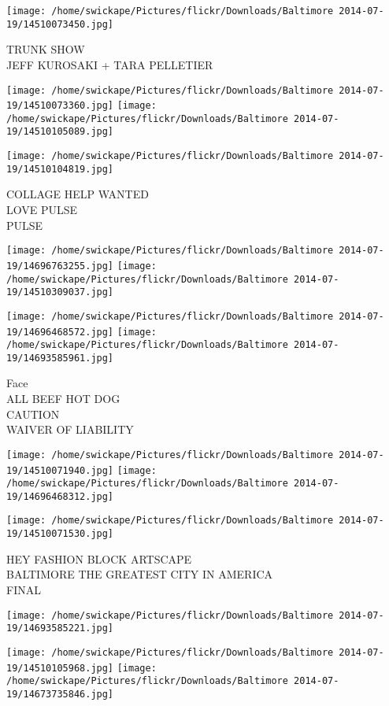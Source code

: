 \documentclass[10pt,letterpaper]{article}
\begin{document}
\vspace{0.25in}
\texttt{[image: /home/swickape/Pictures/flickr/Downloads/Baltimore 2014-07-19/14510073450.jpg]}

TRUNK SHOW\\
JEFF KUROSAKI + TARA PELLETIER
\pagebreak

\texttt{[image: /home/swickape/Pictures/flickr/Downloads/Baltimore 2014-07-19/14510073360.jpg]}
\texttt{[image: /home/swickape/Pictures/flickr/Downloads/Baltimore 2014-07-19/14510105089.jpg]}

\vspace{0.25in}
\texttt{[image: /home/swickape/Pictures/flickr/Downloads/Baltimore 2014-07-19/14510104819.jpg]}

COLLAGE HELP WANTED\\
LOVE PULSE\\
PULSE
\pagebreak

\texttt{[image: /home/swickape/Pictures/flickr/Downloads/Baltimore 2014-07-19/14696763255.jpg]}
\texttt{[image: /home/swickape/Pictures/flickr/Downloads/Baltimore 2014-07-19/14510309037.jpg]}

\texttt{[image: /home/swickape/Pictures/flickr/Downloads/Baltimore 2014-07-19/14696468572.jpg]}
\texttt{[image: /home/swickape/Pictures/flickr/Downloads/Baltimore 2014-07-19/14693585961.jpg]}

Face\\
ALL BEEF HOT DOG\\
CAUTION\\
WAIVER OF LIABILITY
\pagebreak

\texttt{[image: /home/swickape/Pictures/flickr/Downloads/Baltimore 2014-07-19/14510071940.jpg]}
\texttt{[image: /home/swickape/Pictures/flickr/Downloads/Baltimore 2014-07-19/14696468312.jpg]}

\texttt{[image: /home/swickape/Pictures/flickr/Downloads/Baltimore 2014-07-19/14510071530.jpg]}

HEY FASHION BLOCK ARTSCAPE\\
BALTIMORE THE GREATEST CITY IN AMERICA\\
FINAL
\pagebreak

\texttt{[image: /home/swickape/Pictures/flickr/Downloads/Baltimore 2014-07-19/14693585221.jpg]}

\vspace{0.25in}
\texttt{[image: /home/swickape/Pictures/flickr/Downloads/Baltimore 2014-07-19/14510105968.jpg]}
\texttt{[image: /home/swickape/Pictures/flickr/Downloads/Baltimore 2014-07-19/14673735846.jpg]}
\end{document}
